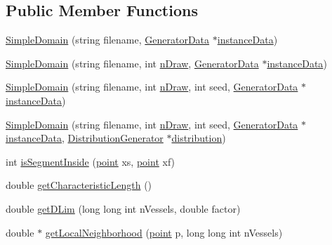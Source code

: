\subsection*{Public Member Functions}
\begin{DoxyCompactItemize}
\item 
\hyperlink{class_simple_domain_a7f9767527c58a3d9a44e4267f97abf09}{Simple\+Domain} (string filename, \hyperlink{class_generator_data}{Generator\+Data} $\ast$\hyperlink{class_abstract_domain_aa37fbabc2bfa92c574f7db7544016b53}{instance\+Data})
\item 
\hyperlink{class_simple_domain_aebd1d37e199fb12d12c6763602ce80b9}{Simple\+Domain} (string filename, int \hyperlink{class_simple_domain_a3558a17833f49034ea65a9d6640403c4}{n\+Draw}, \hyperlink{class_generator_data}{Generator\+Data} $\ast$\hyperlink{class_abstract_domain_aa37fbabc2bfa92c574f7db7544016b53}{instance\+Data})
\item 
\hyperlink{class_simple_domain_a79349a46b135f855cc4942e735de5053}{Simple\+Domain} (string filename, int \hyperlink{class_simple_domain_a3558a17833f49034ea65a9d6640403c4}{n\+Draw}, int seed, \hyperlink{class_generator_data}{Generator\+Data} $\ast$\hyperlink{class_abstract_domain_aa37fbabc2bfa92c574f7db7544016b53}{instance\+Data})
\item 
\hyperlink{class_simple_domain_a53d6b37f30cf6add1978d9c06a4c509c}{Simple\+Domain} (string filename, int \hyperlink{class_simple_domain_a3558a17833f49034ea65a9d6640403c4}{n\+Draw}, int seed, \hyperlink{class_generator_data}{Generator\+Data} $\ast$\hyperlink{class_abstract_domain_aa37fbabc2bfa92c574f7db7544016b53}{instance\+Data}, \hyperlink{class_distribution_generator}{Distribution\+Generator} $\ast$\hyperlink{class_simple_domain_a522b7ae1a103ca9fe78607d5bffab4f2}{distribution})
\item 
int \hyperlink{class_simple_domain_ab1e60afe4302149098b11631d20aebb7}{is\+Segment\+Inside} (\hyperlink{structpoint}{point} xs, \hyperlink{structpoint}{point} xf)
\item 
double \hyperlink{class_simple_domain_a2a7e2919f633368b85aa3e9cfd0e57ab}{get\+Characteristic\+Length} ()
\item 
double \hyperlink{class_simple_domain_a413c188add5702b18bb838283b68bcbe}{get\+D\+Lim} (long long int n\+Vessels, double factor)
\item 
double $\ast$ \hyperlink{class_simple_domain_a0491a8bc37f8e27031f2b67b79eaf45e}{get\+Local\+Neighborhood} (\hyperlink{structpoint}{point} p, long long int n\+Vessels)
\item 

\end{DoxyCompactItemize}
